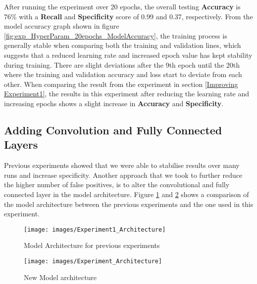 After running the experiment over 20 epochs, the overall testing \textbf{Accuracy} is 76\% with a \textbf{Recall} and \textbf{Specificity} score of 0.99 and 0.37, respectively. From the model accuracy graph shown in figure \ref{fig:exp_HyperParam_20epochs_ModelAccuracy}, the training process is generally stable when comparing both the training and validation lines, which suggests that a reduced learning rate and increased epoch value has kept stability during training. There are slight deviations after the 9th epoch until the 20th where the training and validation accuracy and loss start to deviate from each other. When comparing the result from the experiment in section \ref{Improving Experiment1}, the results in this experiment after reducing the learning rate and increasing epochs shows a slight increase in \textbf{Accuracy} and \textbf{Specificity}. 



\subsection{Adding Convolution and Fully Connected Layers}

Previous experiments showed that we were able to stabilise results over many runs and increase specificity. Another approach that we took to further reduce the higher number of false positives, is to alter the convolutional and fully connected layer in the model architecture. Figure \ref{fig:exp1_example} and \ref{fig:IncConvo} shows a comparison of the model architecture between the previous experiments and the one used in this experiment. 

\begin{figure}[H]
	\centering
	\texttt{[image: images/Experiment1\_Architecture]}
	\caption{Model Architecture for previous experiments}
	\label{fig:exp1_example}
\end{figure}

\begin{figure}[H]
	\centering
	\texttt{[image: images/Experiment\_Architecture]}
	\caption{New Model architecture}
	\label{fig:IncConvo}
\end{figure}



